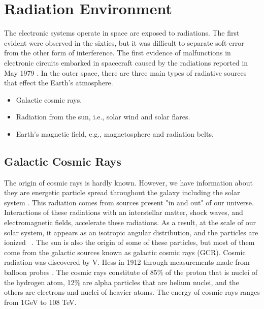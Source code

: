 \section{Radiation Environment}


The electronic systems operate in space are exposed to radiations. The first evident were observed in the sixties, but it was difficult to separate soft-error from the other form of interference. The first evidence of malfunctions in electronic circuits embarked in spacecraft caused by the radiations reported in May 1979 \citep{may1979alpha}. In the outer space, there are three main types of radiative sources that effect the Earth's atmosphere.

\begin{itemize}

\item Galactic cosmic rays.

\item Radiation from the sun, i.e., solar wind and solar flares.

\item Earth's magnetic field, e.g., magnetosphere and radiation belts.

\end{itemize}


\subsection{Galactic Cosmic Rays} 

The origin of cosmic rays is hardly known. However, we have information about they are energetic particle spread throughout the galaxy including the solar system \citep{SWE20216}. This radiation comes from sources present "in and out" of our
universe. Interactions of these radiations with an interstellar matter, shock waves, and electromagnetic fields, accelerate these radiations. As a result, at the scale of our
solar system, it appears as an isotropic angular distribution, and the particles are ionized~ \citep{SWE20216}. The sun is also the origin of some of these particles, but most of them come from the galactic sources known as galactic cosmic rays (GCR).
Cosmic radiation was discovered by V. Hess in 1912 through measurements made from balloon probes \citep{cronin1999cosmic}. The cosmic rays constitute of 85\% of the proton that is nuclei of the hydrogen atom, 12\% are alpha particles that are helium nuclei, and the others are electrons and nuclei of heavier atoms. The energy of cosmic rays ranges from 1GeV to 108 TeV. 


